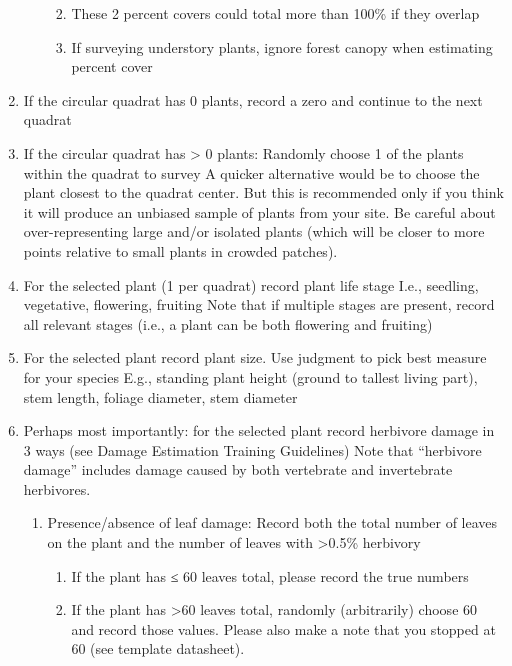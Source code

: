 \documentclass[
  letterpaper,
  oneside,
  open=any]{scrbook}
\begin{document}
\begin{enumerate}
\begin{enumerate}
    \begin{enumerate}
    \def\labelenumiii{\roman{enumiii}.}
    \item
      These 2 percent covers could total more than 100\% if they overlap
    \item
      If surveying understory plants, ignore forest canopy when
      estimating percent cover
    \end{enumerate}
  \end{enumerate}
\item
  If the circular quadrat has 0 plants, record a zero and continue to
  the next quadrat
\item
  If the circular quadrat has \textgreater{} 0 plants: Randomly choose 1
  of the plants within the quadrat to survey A quicker alternative would
  be to choose the plant closest to the quadrat center. But this is
  recommended only if you think it will produce an unbiased sample of
  plants from your site. Be careful about over-representing large and/or
  isolated plants (which will be closer to more points relative to small
  plants in crowded patches).
\item
  For the selected plant (1 per quadrat) record plant life stage I.e.,
  seedling, vegetative, flowering, fruiting Note that if multiple stages
  are present, record all relevant stages (i.e., a plant can be both
  flowering and fruiting)
\item
  For the selected plant record plant size. Use judgment to pick best
  measure for your species E.g., standing plant height (ground to
  tallest living part), stem length, foliage diameter, stem diameter
\item
  Perhaps most importantly: for the selected plant record herbivore
  damage in 3 ways (see Damage Estimation Training Guidelines) Note that
  ``herbivore damage'' includes damage caused by both vertebrate and
  invertebrate herbivores.

  \begin{enumerate}
  \def\labelenumii{\alph{enumii}.}
  \item
    Presence/absence of leaf damage: Record both the total number of
    leaves on the plant and the number of leaves with \textgreater0.5\%
    herbivory

    \begin{enumerate}
    \def\labelenumiii{\roman{enumiii}.}
    \item
      If the plant has ≤ 60 leaves total, please record the true numbers
    \item
      If the plant has \textgreater60 leaves total, randomly
      (arbitrarily) choose 60 and record those values. Please also make
      a note that you stopped at 60 (see template datasheet).
    \end{enumerate}
  \end{enumerate}


\end{enumerate}
\end{document}
